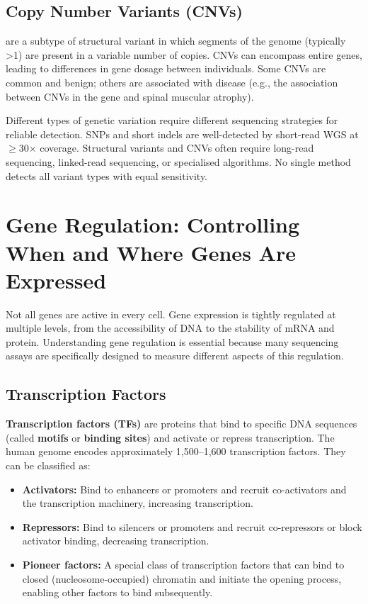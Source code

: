\subsection{Copy Number Variants (CNVs)}
\label{subsec:molbio:cnvs}

\textbf{} are a subtype of structural variant in which segments of the genome (typically >1\kilobase{}) are present in a variable number of copies. CNVs can encompass entire genes, leading to differences in gene dosage between individuals. Some CNVs are common and benign; others are associated with disease (e.g., the association between CNVs in the  gene and spinal muscular atrophy).

\begin{warningbox}
Different types of genetic variation require different sequencing strategies for reliable detection. \acrshort{SNP}s and short indels are well-detected by short-read \acrshort{WGS} at $\geq$30$\times$ coverage. Structural variants and CNVs often require long-read sequencing, linked-read sequencing, or specialised algorithms. No single method detects all variant types with equal sensitivity.
\end{warningbox}


\section{Gene Regulation: Controlling When and Where Genes Are Expressed}
\label{sec:molbio:gene-regulation}

Not all genes are active in every cell. Gene expression is tightly regulated at multiple levels, from the accessibility of DNA to the stability of mRNA and protein. Understanding gene regulation is essential because many sequencing assays are specifically designed to measure different aspects of this regulation.

\subsection{Transcription Factors}
\label{subsec:molbio:tfs}

\textbf{Transcription factors (TFs)} are proteins that bind to specific DNA sequences (called \textbf{motifs} or \textbf{binding sites}) and activate or repress transcription. The human genome encodes approximately 1,500--1,600 transcription factors. They can be classified as:

\begin{itemize}[itemsep=2pt]
  \item \textbf{Activators:} Bind to enhancers or promoters and recruit co-activators and the transcription machinery, increasing transcription.
  \item \textbf{Repressors:} Bind to silencers or promoters and recruit co-repressors or block activator binding, decreasing transcription.
  \item \textbf{Pioneer factors:} A special class of transcription factors that can bind to closed (nucleosome-occupied) chromatin and initiate the opening process, enabling other factors to bind subsequently.
\end{itemize}

